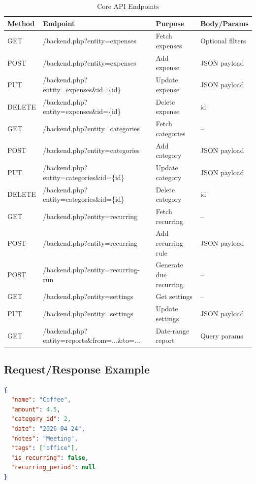 \documentclass[conference]{IEEEtran}
\begin{document}
\begin{table}[H]
\caption{Core API Endpoints}
\label{tab:api}
\centering
\begin{tabular}{|m{1.3cm}|m{3.6cm}|m{2.6cm}|m{2.2cm}|}
\hline
\textbf{Method} & \textbf{Endpoint} & \textbf{Purpose} & \textbf{Body/Params} \\
\hline
GET & /backend.php?entity=expenses & Fetch expenses & Optional filters \\
\hline
POST & /backend.php?entity=expenses & Add expense & JSON payload \\
\hline
PUT & /backend.php?entity=expenses\&id=\{id\} & Update expense & JSON payload \\
\hline
DELETE & /backend.php?entity=expenses\&id=\{id\} & Delete expense & id \\
\hline
GET & /backend.php?entity=categories & Fetch categories & -- \\
\hline
POST & /backend.php?entity=categories & Add category & JSON payload \\
\hline
PUT & /backend.php?entity=categories\&id=\{id\} & Update category & JSON payload \\
\hline
DELETE & /backend.php?entity=categories\&id=\{id\} & Delete category & id \\
\hline
GET & /backend.php?entity=recurring & Fetch recurring & -- \\
\hline
POST & /backend.php?entity=recurring & Add recurring rule & JSON payload \\
\hline
POST & /backend.php?entity=recurring-run & Generate due recurring & -- \\
\hline
GET & /backend.php?entity=settings & Get settings & -- \\
\hline
PUT & /backend.php?entity=settings & Update settings & JSON payload \\
\hline
GET & /backend.php?entity=reports\&from=...\&to=... & Date-range report & Query params \\
\hline
\end{tabular}
\end{table}

\subsection{Request/Response Example}
\begin{lstlisting}[language=json,caption={POST Expense Request}]
{
  "name": "Coffee",
  "amount": 4.5,
  "category_id": 2,
  "date": "2026-04-24",
  "notes": "Meeting",
  "tags": ["office"],
  "is_recurring": false,
  "recurring_period": null
}
\end{lstlisting}
\end{document}
